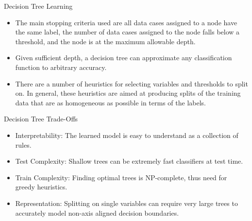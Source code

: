 \documentclass[serif,xcolor=pdftex,dvipsnames,table,hyperref={bookmarks=false}]{beamer}
\begin{document}
\begin{frame}[t]{Decision Tree Learning}

\begin{itemize}
\item The main stopping criteria used are all data cases assigned to a node have the same label, the number of data cases assigned to the node falls below a threshold, and the node is at the maximum allowable depth.

\pause\item Given sufficient depth, a decision tree can approximate any classification function to arbitrary accuracy.

\pause\item There are a number of heuristics for selecting variables and thresholds to split on.
In general, these heuristics are aimed at producing splits of the training data that are as homogeneous as possible in terms of the labels.
\end{itemize}

\end{frame}

\begin{frame}[t]{Decision Tree Trade-Offs}

\begin{itemize}
\item Interpretability: The learned model is easy to understand as a collection of rules.

\pause \item Test Complexity: Shallow trees can be extremely fast classifiers at test time.

\pause \item Train Complexity: Finding optimal trees is NP-complete, thus need for greedy heuristics.

\pause \item Representation: Splitting on single variables can require very large trees to
accurately model non-axis aligned decision boundaries.
\end{itemize}

\end{frame}
\end{document}
